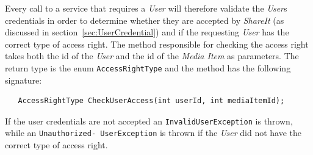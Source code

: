\documentclass[../report.tex]{subfiles}
\begin{document}
Every call to a service that requires a \textit{User} will therefore validate the \textit{User}s credentials in order to determine whether they are accepted by \textit{ShareIt} (as discussed in section~\ref{sec:UserCredential}) and if the requesting \textit{User} has the correct type of access right. The method responsible for checking the access right takes both the id of the \textit{User} and the id of the \textit{Media Item} as parameters. The return type is the enum \texttt{AccessRightType} and the method has the following signature:

\begin{lstlisting}
   AccessRightType CheckUserAccess(int userId, int mediaItemId);
\end{lstlisting}


If the user credentials are not accepted an \texttt{InvalidUserException} is thrown, while an \texttt{Unauthorized- UserException} is thrown if the \textit{User} did not have the correct type of access right. 
\end{document}
